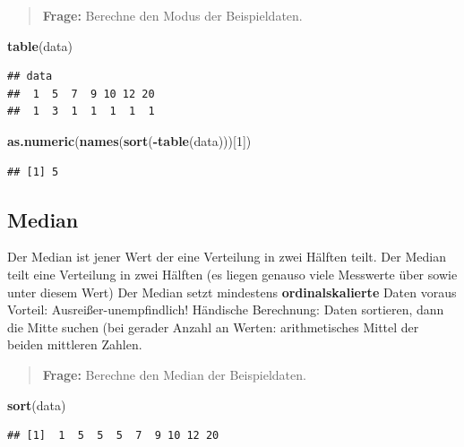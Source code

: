 \documentclass[
]{book}
\newenvironment{Shaded}{\begin{snugshade}}{\end{snugshade}}
\newcommand{\DecValTok}[1]{\textcolor[rgb]{0.00,0.00,0.81}{#1}}
\newcommand{\KeywordTok}[1]{\textcolor[rgb]{0.13,0.29,0.53}{\textbf{#1}}}
\newcommand{\NormalTok}[1]{#1}
\newcommand{\OperatorTok}[1]{\textcolor[rgb]{0.81,0.36,0.00}{\textbf{#1}}}
\begin{document}
\begin{quote}
\textbf{Frage:} Berechne den Modus der Beispieldaten.
\end{quote}

\begin{Shaded}
\begin{Highlighting}[]
\KeywordTok{table}\NormalTok{(data)}
\end{Highlighting}
\end{Shaded}

\begin{verbatim}
## data
##  1  5  7  9 10 12 20 
##  1  3  1  1  1  1  1
\end{verbatim}

\begin{Shaded}
\begin{Highlighting}[]
\KeywordTok{as.numeric}\NormalTok{(}\KeywordTok{names}\NormalTok{(}\KeywordTok{sort}\NormalTok{(}\OperatorTok{-}\KeywordTok{table}\NormalTok{(data)))[}\DecValTok{1}\NormalTok{])}
\end{Highlighting}
\end{Shaded}

\begin{verbatim}
## [1] 5
\end{verbatim}

\hypertarget{median}{%
\subsection{Median}\label{median}}

Der Median ist jener Wert der eine Verteilung in zwei Hälften teilt. Der Median teilt eine Verteilung in zwei Hälften (es liegen genauso viele Messwerte über sowie unter diesem Wert) Der Median setzt mindestens \textbf{ordinalskalierte} Daten voraus Vorteil: Ausreißer-unempfindlich! Händische Berechnung: Daten sortieren, dann die Mitte suchen (bei gerader Anzahl an Werten: arithmetisches Mittel der beiden mittleren Zahlen.

\begin{quote}
\textbf{Frage:} Berechne den Median der Beispieldaten.
\end{quote}

\begin{Shaded}
\begin{Highlighting}[]
\KeywordTok{sort}\NormalTok{(data)}
\end{Highlighting}
\end{Shaded}

\begin{verbatim}
## [1]  1  5  5  5  7  9 10 12 20
\end{verbatim}
\end{document}
